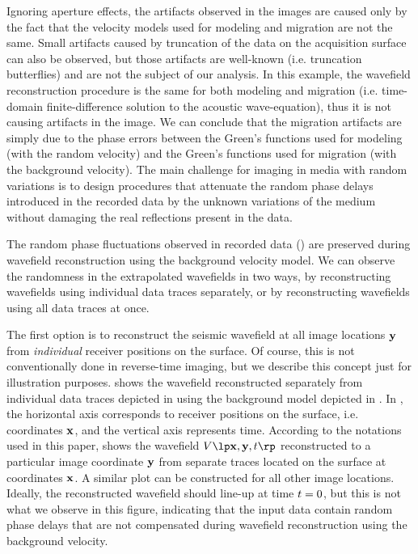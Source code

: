 Ignoring aperture effects, the artifacts observed in the images are
caused only by the fact that the velocity models used for modeling and
migration are not the same. Small artifacts caused by truncation of
the data on the acquisition surface can also be observed, but those
artifacts are well-known (i.e. truncation butterflies) and are not the
subject of our analysis. In this example, the wavefield reconstruction
procedure is the same for both modeling and migration
(i.e. time-domain finite-difference solution to the acoustic
wave-equation), thus it is not causing artifacts in the image. We can
conclude that the migration artifacts are simply due to the phase
errors between the Green's functions used for modeling (with the
random velocity) and the Green's functions used for migration (with
the background velocity). The main challenge for imaging in media with
random variations is to design procedures that attenuate the random
phase delays introduced in the recorded data by the unknown variations
of the medium without damaging the real reflections present in the
data.


The random phase fluctuations observed in recorded data
() are preserved during wavefield reconstruction using
the background velocity model.  We can observe the randomness in the
extrapolated wavefields in two ways, by reconstructing wavefields
using individual data traces separately, or by reconstructing
wavefields using all data traces at once.

The first option is to reconstruct the seismic wavefield at all image
locations ${\mathbf{y}}$ from {\it individual} receiver positions on the
surface. Of course, this is not conventionally done in reverse-time
imaging, but we describe this concept just for illustration purposes.
 shows the wavefield reconstructed separately from
individual data traces depicted in  using the
background model depicted in . In ,
the horizontal axis corresponds to receiver positions on the surface,
i.e. coordinates ${\mathbf{x}}$, and the vertical axis represents time.
According to the notations used in this paper,  shows
the wavefield $\VV{\xm,\ym,\tm}$ reconstructed to a particular image
coordinate ${\mathbf{y}}$ from separate traces located on the surface at
coordinates ${\mathbf{x}}$. A similar plot can be constructed for all other
image locations. Ideally, the reconstructed wavefield should line-up
at time ${t}=0$, but this is not what we observe in this figure,
indicating that the input data contain random phase delays that are
not compensated during wavefield reconstruction using the background
velocity.

